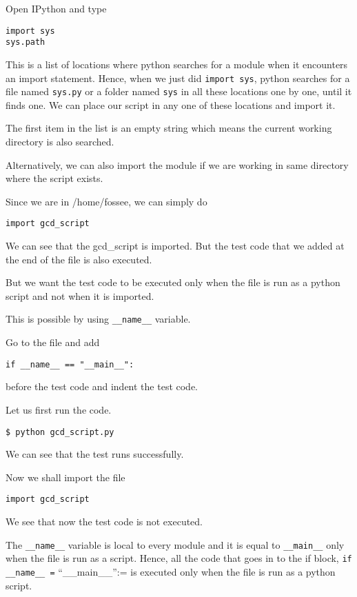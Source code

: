 \documentclass[presentation]{beamer}
\begin{document}
Open IPython and type

\begin{verbatim}
import sys
sys.path
\end{verbatim}

This is a list of locations where python searches for a module when it
encounters an import statement. Hence, when we just did \texttt{import sys},
python searches for a file named \texttt{sys.py} or a folder named \texttt{sys} in all
these locations one by one, until it finds one. We can place our script
in any one of these locations and import it.

The first item in the list is an empty string which means the current
working directory is also searched.

Alternatively, we can also import the module if we are working in same
directory where the script exists.

Since we are in /home/fossee, we can simply do

\begin{verbatim}
import gcd_script
\end{verbatim}

We can see that the gcd\_script is imported. But the test code that we
added at the end of the file is also executed.

But we want the test code to be executed only when the file is run as a
python script and not when it is imported.

This is possible by using \texttt{\_\_name\_\_} variable.

Go to the file and add

\begin{verbatim}
if __name__ == "__main__":
\end{verbatim}

before the test code and indent the test code.

Let us first run the code.

\begin{verbatim}
$ python gcd_script.py
\end{verbatim}

We can see that the test runs successfully.

Now we shall import the file

\begin{verbatim}
import gcd_script
\end{verbatim}

We see that now the test code is not executed.

The \texttt{\_\_name\_\_} variable is local to every module and it is equal to
\texttt{\_\_main\_\_} only when the file is run as a script. Hence, all the code
that goes in to the if block, \texttt{if \_\_name\_\_ =} ``__main__'':= is executed
only when the file is run as a python script.
\end{document}
